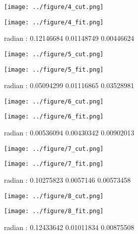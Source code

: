 \documentclass{article}
\begin{document}
\begin{figure}[H]
\begin{minipage}{0.48\linewidth}
  \centerline{\texttt{[image: ../figure/4\_cut.png]}}
\end{minipage}
\hfill
\begin{minipage}{0.48\linewidth}
  \centerline{\texttt{[image: ../figure/4\_fit.png]}}
\end{minipage}
\caption{radian : 0.12146684 0.01148749 0.00446624}
\end{figure}

 \begin{figure}[H]
\begin{minipage}{0.48\linewidth}
  \centerline{\texttt{[image: ../figure/5\_cut.png]}}
\end{minipage}
\hfill
\begin{minipage}{0.48\linewidth}
  \centerline{\texttt{[image: ../figure/5\_fit.png]}}
\end{minipage}
\caption{radian : 0.05094299 0.01116865 0.03528981}
\end{figure}

\begin{figure}[H]
\begin{minipage}{0.48\linewidth}
  \centerline{\texttt{[image: ../figure/6\_cut.png]}}
\end{minipage}
\hfill
\begin{minipage}{0.48\linewidth}
  \centerline{\texttt{[image: ../figure/6\_fit.png]}}
\end{minipage}
\caption{radian : 0.00536094 0.00430342 0.00902013}
\end{figure}

  \begin{figure}[H]
\begin{minipage}{0.48\linewidth}
  \centerline{\texttt{[image: ../figure/7\_cut.png]}}
\end{minipage}
\hfill
\begin{minipage}{0.48\linewidth}
  \centerline{\texttt{[image: ../figure/7\_fit.png]}}
\end{minipage}
\caption{radian : 0.10275823 0.0057146  0.00573458}
\end{figure}


 \begin{figure}[H]
\begin{minipage}{0.48\linewidth}
  \centerline{\texttt{[image: ../figure/8\_cut.png]}}
\end{minipage}
\hfill
\begin{minipage}{0.48\linewidth}
  \centerline{\texttt{[image: ../figure/8\_fit.png]}}
\end{minipage}
\caption{radian : 0.12433642 0.01011834 0.00875508}
\end{figure}
\end{document}
